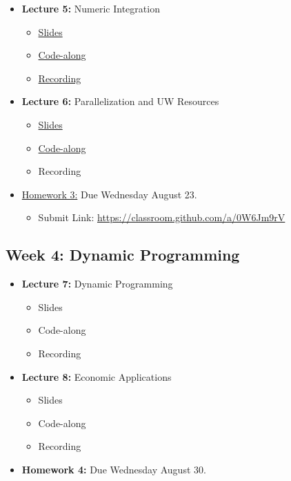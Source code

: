 \documentclass[
]{book}
\providecommand{\tightlist}{%
  \setlength{\itemsep}{0pt}\setlength{\parskip}{0pt}}
\begin{document}
\begin{itemize}
\tightlist
\item
  \textbf{Lecture 5:} Numeric Integration

  \begin{itemize}
  \tightlist
  \item
    \href{https://kevinghunt.github.io/ComputationCamp/lectures/Lecture5.html}{Slides}
  \item
    \href{https://kevinghunt.github.io/ComputationCamp/codealongs/CodeAlong5.jl}{Code-along}
  \item
    \href{https://uwmadison.zoom.us/rec/share/Rc-Mno_HDmfyakQGBhzxhbOjYIxXkX8ka4vkksy2p5Y-lxDZCJ2x08U8ja6LzMEV.54CVfkLcQhOLID_m}{Recording}
  \end{itemize}
\item
  \textbf{Lecture 6:} Parallelization and UW Resources

  \begin{itemize}
  \tightlist
  \item
    \href{https://kevinghunt.github.io/ComputationCamp/lectures/Lecture6.html}{Slides}
  \item
    \href{https://kevinghunt.github.io/ComputationCamp/codealongs/CodeAlong6.jl}{Code-along}
  \item
    Recording
  \end{itemize}
\item
  \href{https://kevinghunt.github.io/ComputationCamp/homeworks/homework3.html}{Homework 3:} Due Wednesday August 23.

  \begin{itemize}
  \tightlist
  \item
    Submit Link: \url{https://classroom.github.com/a/0W6Jm9rV}
  \end{itemize}
\end{itemize}

\hypertarget{week-4-dynamic-programming}{%
\subsection{Week 4: Dynamic Programming}\label{week-4-dynamic-programming}}

\begin{itemize}
\tightlist
\item
  \textbf{Lecture 7:} Dynamic Programming

  \begin{itemize}
  \tightlist
  \item
    Slides
  \item
    Code-along
  \item
    Recording
  \end{itemize}
\item
  \textbf{Lecture 8:} Economic Applications

  \begin{itemize}
  \tightlist
  \item
    Slides
  \item
    Code-along
  \item
    Recording
  \end{itemize}
\item
  \textbf{Homework 4:} Due Wednesday August 30.
\end{itemize}
\end{document}
